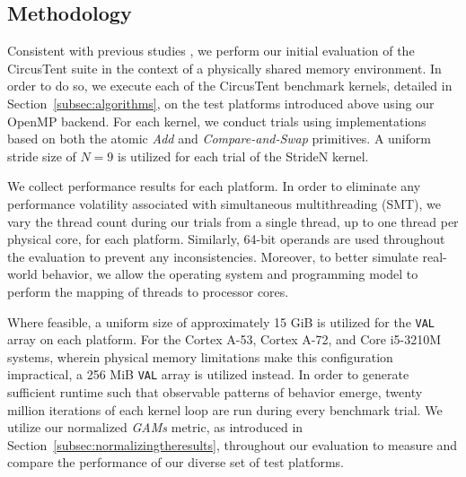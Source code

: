 
\subsection{Methodology}
\label{subsec:methodology}

Consistent with previous studies \cite{villa2008barriers}\cite{david2013sync}\cite{schweizer2015evaluating}\cite{hoseini2019modeling}, we perform our initial evaluation of the CircusTent suite in the context of a physically shared memory environment.
In order to do so, we execute each of the CircusTent benchmark kernels, detailed in Section~\ref{subsec:algorithms}, on the test platforms introduced above using our OpenMP backend.
For each kernel, we conduct trials using implementations based on both the atomic \textit{Add} and \textit{Compare-and-Swap} primitives.
A uniform stride size of $N=9$ is utilized for each trial of the StrideN kernel.

We collect performance results for each platform.
In order to eliminate any performance volatility associated with simultaneous multithreading (SMT), we vary the thread count during our trials from a single thread, up to one thread per physical core, for each platform.
Similarly, 64-bit operands are used throughout the evaluation to prevent any inconsistencies.
Moreover, to better simulate real-world behavior, we allow the operating system and programming model to perform the mapping of threads to processor cores.

Where feasible, a uniform size of approximately 15 GiB is utilized for the \texttt{VAL} array on each platform.
For the Cortex A-53, Cortex A-72, and Core i5-3210M systems, wherein physical memory limitations make this configuration impractical, a 256 MiB \texttt{VAL} array is utilized instead.
In order to generate sufficient runtime such that observable patterns of behavior emerge, twenty million iterations of each kernel loop are run during every benchmark trial.
We utilize our normalized \textit{GAMs} metric, as introduced in Section~\ref{subsec:normalizingtheresults}, throughout our evaluation to measure and compare the performance of our diverse set of test platforms.

